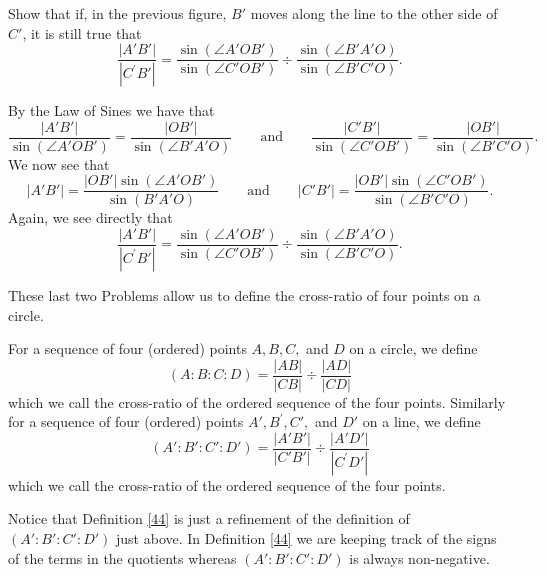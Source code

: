 \documentclass{ximera}
\begin{document}
\begin{problem}\label{49}
Show that if, in the previous figure, $B'$ moves
along the line to the other side of $C'$, it is still true that%
\[
\frac{\left\vert A'B'\right\vert }{\left\vert C^{\prime
}B'\right\vert }=\frac{\sin\left(  \angle A'%
OB'\right)  }{\sin\left(  \angle C'OB'\right)
}\div\frac{\sin\left(  \angle B'A'O\right)
}{\sin\left(  \angle B'C'O\right)  }.
\]
\begin{freeResponse}
By the Law of Sines we have that
\[
\frac{|A'B'|}{\sin(\angle A'OB')} = \frac{|OB'|}{\sin(\angle B'A'O)}\qquad\text{and}\qquad\frac{|C'B'|}{\sin(\angle C'OB')} = \frac{|OB'|}{\sin(\angle B'C'O)}.
\]
We now see that
\[
|A'B'| = \frac{|OB'|\sin(\angle A'OB')}{\sin(B'A'O)}\qquad\text{and}\qquad|C'B'| = \frac{|OB'|\sin(\angle C'OB')}{\sin(\angle B'C'O)}.
\]
Again, we see directly that 
\[
\frac{\left\vert A'B'\right\vert }{\left\vert C^{\prime
}B'\right\vert }=\frac{\sin\left(  \angle A'%
OB'\right)  }{\sin\left(  \angle C'OB'\right)
}\div\frac{\sin\left(  \angle B'A'O\right)
}{\sin\left(  \angle B'C'O\right)  }.
\]
\end{freeResponse}
\end{problem}

These last two Problems allow us to define the cross-ratio of four
points on a circle.

\begin{definition}
For a sequence of four (ordered) points $A,B,C,$ and $D$ on a circle,
we define%
\[
\left(  A:B:C:D\right)  =\frac{\left\vert AB\right\vert }{\left\vert
CB\right\vert }\div\frac{\left\vert AD\right\vert }{\left\vert CD\right\vert }%
\]
which we call the cross-ratio of the ordered sequence of the four points.
Similarly for a sequence of four (ordered) points $A',B^{\prime
},C',$ and $D'$ on a line, we define%
\[
\left(  A':B':C':D'\right)  =\frac{\left\vert
A'B'\right\vert }{\left\vert C'B'\right\vert
}\div\frac{\left\vert A'D'\right\vert }{\left\vert C^{\prime
}D'\right\vert }%
\]
which we call the cross-ratio of the ordered sequence of the four points.
\end{definition}

Notice that Definition \ref{44} is just a refinement of the definition
of $\left( A':B':C':D'\right) $ just above. In Definition \ref{44} we
are keeping track of the signs of the terms in the quotients whereas
$\left( A':B':C':D'\right)$ is always non-negative.
\end{document}
